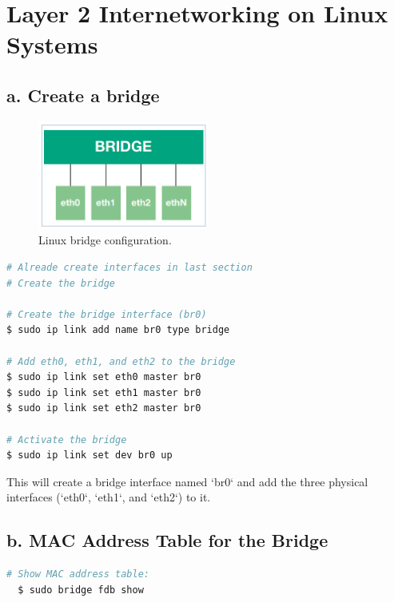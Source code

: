 \documentclass{report}
\begin{document}
\section*{Layer 2 Internetworking on Linux Systems}


\subsection*{a. Create a bridge}


\begin{figure}[h] 
  \centering 
  \includegraphics[width=0.5\textwidth]{22.png} 
  \captionsetup{labelformat=empty}
  \caption{Linux bridge configuration.\cite{5}}
\end{figure} 

\begin{lstlisting}[language=bash]
# Alreade create interfaces in last section
# Create the bridge 

# Create the bridge interface (br0)
$ sudo ip link add name br0 type bridge

# Add eth0, eth1, and eth2 to the bridge
$ sudo ip link set eth0 master br0
$ sudo ip link set eth1 master br0
$ sudo ip link set eth2 master br0

# Activate the bridge
$ sudo ip link set dev br0 up
\end{lstlisting}

This will create a bridge interface named `br0` and add the three physical interfaces (`eth0`, `eth1`, and `eth2`) to it.


\subsection*{b. MAC Address Table for the Bridge}
\begin{lstlisting}[language=bash]
  # Show MAC address table:
  $ sudo bridge fdb show
\end{lstlisting}
\end{document}
